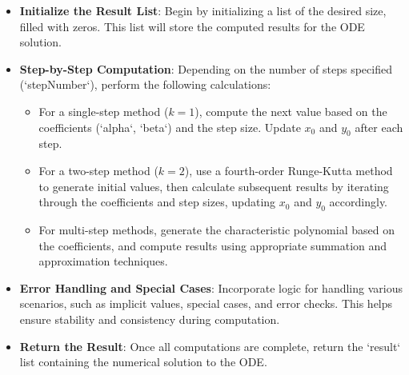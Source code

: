 \begin{itemize}
    \item \textbf{Initialize the Result List}: Begin by initializing a list of the desired size, filled with zeros. This list will store the computed results for the ODE solution.
    
    \item \textbf{Step-by-Step Computation}: Depending on the number of steps specified (`stepNumber`), perform the following calculations:
        \begin{itemize}
            \item For a single-step method (\(k = 1\)), compute the next value based on the coefficients (`alpha`, `beta`) and the step size. Update \(x_0\) and \(y_0\) after each step.
            \item For a two-step method (\(k = 2\)), use a fourth-order Runge-Kutta method to generate initial values, then calculate subsequent results by iterating through the coefficients and step sizes, updating \(x_0\) and \(y_0\) accordingly.
            \item For multi-step methods, generate the characteristic polynomial based on the coefficients, and compute results using appropriate summation and approximation techniques.
        \end{itemize}
    
    \item \textbf{Error Handling and Special Cases}: Incorporate logic for handling various scenarios, such as implicit values, special cases, and error checks. This helps ensure stability and consistency during computation.
    
    \item \textbf{Return the Result}: Once all computations are complete, return the `result` list containing the numerical solution to the ODE.
\end{itemize}

\newpage

